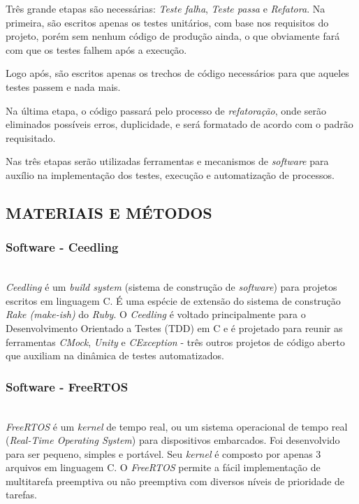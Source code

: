 \documentclass[times, twoside, watermark]{artigo}
\begin{document}
Três grande etapas são necessárias: \textit{Teste falha}, \textit{Teste passa}
e \textit{Refatora}. Na primeira, são escritos apenas os testes unitários, com base 
nos requisitos do projeto, porém sem nenhum código de produção ainda, o que 
obviamente fará com que os testes falhem após a execução.

Logo após, são escritos apenas os trechos de código necessários para que aqueles 
testes passem e nada mais.

Na última etapa, o código passará pelo processo de \textit{refatoração}, onde serão 
eliminados possíveis erros, duplicidade, e será formatado de acordo com o padrão 
requisitado.

Nas três etapas serão utilizadas ferramentas e mecanismos de \textit{software} para 
auxílio na implementação dos testes, execução e automatização de processos.

\subsection{MATERIAIS E MÉTODOS}

\subsubsection{Software - Ceedling}\hfill\\

\textit{Ceedling} é um \textit{build system} (sistema de construção de 
\textit{software}) para projetos escritos em linguagem C.
É uma espécie de extensão do sistema de construção \textit{Rake (make-ish)} do \textit{Ruby}.
O \textit{Ceedling} é voltado principalmente para o 
Desenvolvimento Orientado a Testes (TDD) em C e é projetado para reunir as ferramentas \textit{CMock},
\textit{Unity} e \textit{CException} - três outros projetos de código aberto 
que auxiliam na dinâmica de testes automatizados\cite{gomes2016uttos}.


\subsubsection{Software - FreeRTOS}\hfill\\

\textit{FreeRTOS} é um \textit{kernel} de tempo real, 
ou um sistema operacional de tempo real (\textit{Real-Time Operating System}) 
para dispositivos embarcados. Foi desenvolvido para ser pequeno, simples e portável. 
Seu \textit{kernel} é composto por apenas 3 arquivos em linguagem C. 
O \textit{FreeRTOS} permite a fácil implementação de multitarefa preemptiva 
ou não preemptiva com diversos níveis de prioridade de tarefas\cite{zhu2016understanding}.
\end{document}
